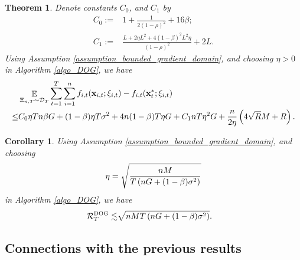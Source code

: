 \documentclass{article}
\newtheorem{Theorem}{\bf{Theorem}}
\newtheorem{Corollary}{\bf{Corollary}}
\newtheorem{Assumption}{\bf{Assumption}}
\begin{document}
{\color{red} 
\begin{Theorem}
\label{theorem_regret_upper_bound}
Denote constants $C_0$, and $C_1$ by
\begin{align}
\nonumber
C_0 := & 1 + \frac{1}{2(1-\rho)^2}+16\beta; \\ \nonumber
C_1 := & \frac{L + 2\eta L^2  + 4(1-\beta)^2L^2 \eta}{(1-\rho)^2} +2L.
\end{align} Using Assumption \ref{assumption_bounded_gradient_domain}, and choosing $\eta>0$ in Algorithm \ref{algo_DOG}, we have
\begin{align}
\nonumber
& \mathop{\mathbb{E}}_{ \Xi_{n,T} \sim \mathcal{D}_{T} } \sum_{t=1}^T\sum_{i=1}^n f_{i,t}({\bf x}_{i,t};\xi_{i,t}) - f_{i,t}({\bf x}_t^\ast;\xi_{i,t}) \\ \nonumber
\le & C_0\eta T n\beta  G + (1-\beta)\eta T\sigma^2 + 4n(1-\beta)T\eta G  + C_1  nT\eta^2 G    + \frac{n}{2\eta}\left(  4\sqrt{R}M + R   \right).
\end{align}

\end{Theorem}


\begin{Corollary}
\label{corollary_regret_upper_bound}
Using Assumption \ref{assumption_bounded_gradient_domain}, and choosing 
\begin{align}
\nonumber
\eta = \sqrt{\frac{nM}{ T\left( nG + (1-\beta)\sigma^2 \right) }}
\end{align} in Algorithm \ref{algo_DOG}, we have
\begin{align}
\nonumber
{\mathcal{R}}_T^{\textsc{DOG}} \lesssim & \sqrt{nMT\left(  nG + (1-\beta)\sigma^2 \right)}.
\end{align}

\end{Corollary}
}



\subsection{Connections with the previous results}










%
\end{document}
